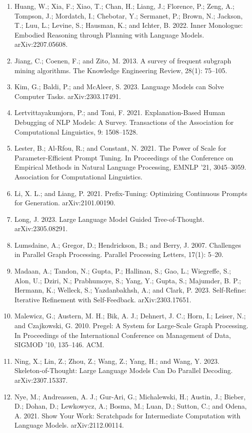 \documentclass[11pt,UTF8,fontset=fandol]{ctexart}
\begin{document}
\begin{enumerate}[leftmargin=2em]
\item Huang, W.; Xia, F.; Xiao, T.; Chan, H.; Liang, J.; Florence, P.; Zeng, A.; Tompson, J.; Mordatch, I.; Chebotar, Y.; Sermanet, P.; Brown, N.; Jackson, T.; Luu, L.; Levine, S.; Hausman, K.; and Ichter, B. 2022. Inner Monologue: Embodied Reasoning through Planning with Language Models. arXiv:2207.05608.
\item Jiang, C.; Coenen, F.; and Zito, M. 2013. A survey of frequent subgraph mining algorithms. The Knowledge Engineering Review, 28(1): 75--105.
\item Kim, G.; Baldi, P.; and McAleer, S. 2023. Language Models can Solve Computer Tasks. arXiv:2303.17491.
\item Lertvittayakumjorn, P.; and Toni, F. 2021. Explanation-Based Human Debugging of NLP Models: A Survey. Transactions of the Association for Computational Linguistics, 9: 1508--1528.
\item Lester, B.; Al-Rfou, R.; and Constant, N. 2021. The Power of Scale for Parameter-Efficient Prompt Tuning. In Proceedings of the Conference on Empirical Methods in Natural Language Processing, EMNLP '21, 3045--3059. Association for Computational Linguistics.
\item Li, X. L.; and Liang, P. 2021. Prefix-Tuning: Optimizing Continuous Prompts for Generation. arXiv:2101.00190.
\item Long, J. 2023. Large Language Model Guided Tree-of-Thought. arXiv:2305.08291.
\item Lumsdaine, A.; Gregor, D.; Hendrickson, B.; and Berry, J. 2007. Challenges in Parallel Graph Processing. Parallel Processing Letters, 17(1): 5--20.
\item Madaan, A.; Tandon, N.; Gupta, P.; Hallinan, S.; Gao, L.; Wiegreffe, S.; Alon, U.; Dziri, N.; Prabhumoye, S.; Yang, Y.; Gupta, S.; Majumder, B. P.; Hermann, K.; Welleck, S.; Yazdanbakhsh, A.; and Clark, P. 2023. Self-Refine: Iterative Refinement with Self-Feedback. arXiv:2303.17651.
\item Malewicz, G.; Austern, M. H.; Bik, A. J.; Dehnert, J. C.; Horn, I.; Leiser, N.; and Czajkowski, G. 2010. Pregel: A System for Large-Scale Graph Processing. In Proceedings of the International Conference on Management of Data, SIGMOD '10, 135--146. ACM.
\item Ning, X.; Lin, Z.; Zhou, Z.; Wang, Z.; Yang, H.; and Wang, Y. 2023. Skeleton-of-Thought: Large Language Models Can Do Parallel Decoding. arXiv:2307.15337.
\item Nye, M.; Andreassen, A. J.; Gur-Ari, G.; Michalewski, H.; Austin, J.; Bieber, D.; Dohan, D.; Lewkowycz, A.; Bosma, M.; Luan, D.; Sutton, C.; and Odena, A. 2021. Show Your Work: Scratchpads for Intermediate Computation with Language Models. arXiv:2112.00114.

\end{enumerate}
\end{document}
